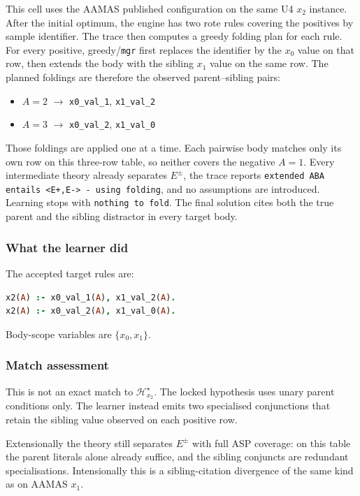 \documentclass[11pt]{article}
\begin{document}
This cell uses the AAMAS published configuration on the same U4 \(x_2\) instance. After the initial optimum, the engine has two rote rules covering the positives by sample identifier. The trace then computes a greedy folding plan for each rule. For every positive, greedy/\texttt{mgr} first replaces the identifier by the \(x_0\) value on that row, then extends the body with the sibling \(x_1\) value on the same row. The planned foldings are therefore the observed parent--sibling pairs:

\begin{itemize}
  \item \(A=2\) \(\rightarrow\) \texttt{x0\_val\_1}, \texttt{x1\_val\_2}
  \item \(A=3\) \(\rightarrow\) \texttt{x0\_val\_2}, \texttt{x1\_val\_0}
\end{itemize}

Those foldings are applied one at a time. Each pairwise body matches only its own row on this three-row table, so neither covers the negative \(A=1\). Every intermediate theory already separates \(E^\pm\), the trace reports \texttt{extended ABA entails <E+,E-> - using folding}, and no assumptions are introduced. Learning stops with \texttt{nothing to fold}. The final solution cites both the true parent and the sibling distractor in every target body.

\subsubsection{What the learner did}

The accepted target rules are:

\begin{lstlisting}[style=logic,language=Prolog]
x2(A) :- x0_val_1(A), x1_val_2(A).
x2(A) :- x0_val_2(A), x1_val_0(A).
\end{lstlisting}

Body-scope variables are \(\{x_0,x_1\}\).

\subsubsection{Match assessment}

This is not an exact match to \(\mathcal{H}_{x_2}^\star\). The locked hypothesis uses unary parent conditions only. The learner instead emits two specialised conjunctions that retain the sibling value observed on each positive row.

Extensionally the theory still separates \(E^\pm\) with full ASP coverage: on this table the parent literals alone already suffice, and the sibling conjuncts are redundant specialisations. Intensionally this is a sibling-citation divergence of the same kind as on AAMAS \(x_1\).
\end{document}
